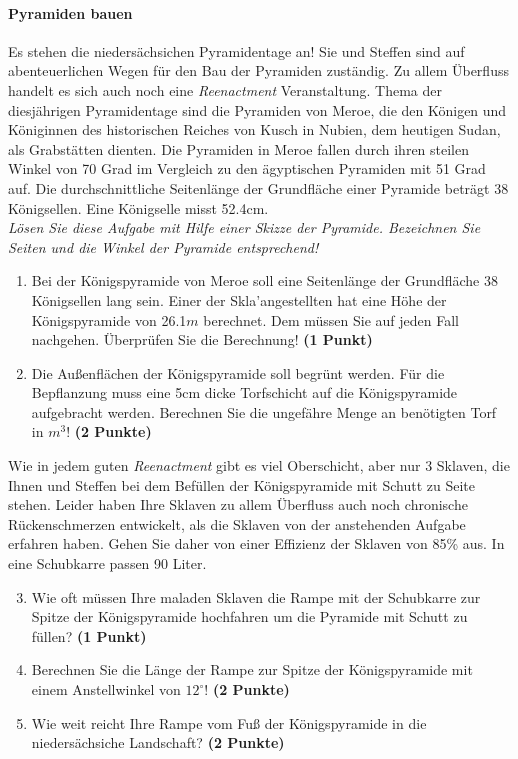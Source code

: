 \documentclass[a4paper, 9pt]{scrartcl}\usepackage[]{graphicx}\usepackage[]{xcolor}
\begin{document}
\ifcollection
\paragraph{Pyramiden bauen}
\fi



Es stehen die niedersächsichen Pyramidentage an! Sie und Steffen sind auf abenteuerlichen Wegen für den Bau der Pyramiden zuständig. Zu allem Überfluss handelt es sich auch noch eine \textit{Reenactment} Veranstaltung. Thema der diesjährigen Pyramidentage sind die Pyramiden von Meroe, die den Königen und Königinnen des historischen Reiches von Kusch in Nubien, dem heutigen Sudan, als Grabstätten dienten. Die Pyramiden in Meroe fallen durch ihren steilen Winkel von 70 Grad im Vergleich zu den ägyptischen Pyramiden mit 51 Grad auf. Die durchschnittliche Seitenlänge der Grundfläche einer Pyramide beträgt 38 Königsellen. Eine Königselle misst 52.4cm.\\

\textit{Lösen Sie diese Aufgabe mit Hilfe einer Skizze der Pyramide. Bezeichnen Sie Seiten und die Winkel der Pyramide entsprechend!}

\begin{enumerate}
\item Bei der Königspyramide von Meroe soll eine Seitenlänge der Grundfläche 38 Königsellen lang sein. Einer der Skla'angestellten hat eine Höhe der Königspyramide von 26.1$m$ berechnet. Dem müssen Sie auf jeden Fall nachgehen. Überprüfen Sie die Berechnung! \textbf{(1 Punkt)}
\item Die Außenflächen der Königspyramide soll begrünt werden. Für die Bepflanzung muss eine 5cm dicke Torfschicht auf die Königspyramide aufgebracht werden. Berechnen Sie die ungefähre Menge an benötigten Torf in $m^3$! \textbf{(2 Punkte)}
\end{enumerate}

Wie in jedem guten \textit{Reenactment} gibt es viel Oberschicht, aber nur 3 Sklaven, die Ihnen und Steffen bei dem Befüllen der Königspyramide mit Schutt zu Seite stehen. Leider haben Ihre Sklaven zu allem Überfluss auch noch chronische Rückenschmerzen entwickelt, als die Sklaven von der anstehenden Aufgabe erfahren haben. Gehen Sie daher von einer Effizienz der Sklaven von 85\% aus. In eine Schubkarre passen 90 Liter.

\begin{enumerate}
  \setcounter{enumi}{2}
\item Wie oft müssen Ihre maladen Sklaven die Rampe mit der Schubkarre zur Spitze der Königspyramide hochfahren um die Pyramide mit Schutt zu füllen? \textbf{(1 Punkt)}
\item Berechnen Sie die Länge der Rampe zur Spitze der Königspyramide mit einem Anstellwinkel von $12^\circ$! \textbf{(2 Punkte)}
\item Wie weit reicht Ihre Rampe vom Fuß der Königspyramide in die niedersächsiche Landschaft?  \textbf{(2 Punkte)}
\end{enumerate}
\end{document}

